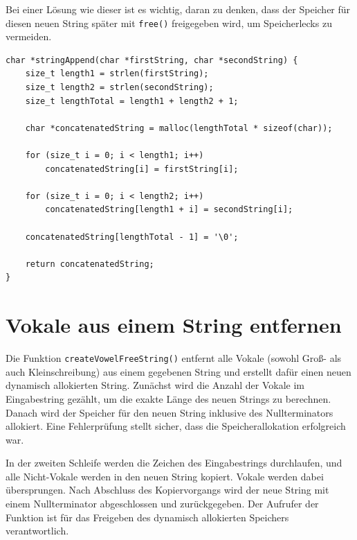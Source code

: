 Bei einer Lösung wie dieser ist es wichtig, daran zu denken, dass der Speicher
für diesen neuen String später mit \texttt{free()} freigegeben wird, um
Speicherlecks zu vermeiden.

\begin{verbatim}
char *stringAppend(char *firstString, char *secondString) {
    size_t length1 = strlen(firstString);
    size_t length2 = strlen(secondString);
    size_t lengthTotal = length1 + length2 + 1;

    char *concatenatedString = malloc(lengthTotal * sizeof(char));

    for (size_t i = 0; i < length1; i++)
        concatenatedString[i] = firstString[i];

    for (size_t i = 0; i < length2; i++)
        concatenatedString[length1 + i] = secondString[i];

    concatenatedString[lengthTotal - 1] = '\0';

    return concatenatedString;
}
\end{verbatim}





\chapter{Vokale aus einem String entfernen}

Die Funktion \texttt{createVowelFreeString()} entfernt alle Vokale
(sowohl Groß- als auch Kleinschreibung) aus einem gegebenen String und erstellt
dafür einen neuen dynamisch allokierten String. Zunächst wird die Anzahl der
Vokale im Eingabestring gezählt, um die exakte Länge des neuen Strings zu
berechnen. Danach wird der Speicher für den neuen String inklusive des
Nullterminators allokiert. Eine Fehlerprüfung stellt sicher, dass die
Speicherallokation erfolgreich war.

In der zweiten Schleife werden die Zeichen des Eingabestrings durchlaufen, und
alle Nicht-Vokale werden in den neuen String kopiert. Vokale werden dabei
übersprungen. Nach Abschluss des Kopiervorgangs wird der neue String mit einem
Nullterminator abgeschlossen und zurückgegeben. Der Aufrufer der Funktion ist
für das Freigeben des dynamisch allokierten Speichers verantwortlich.

